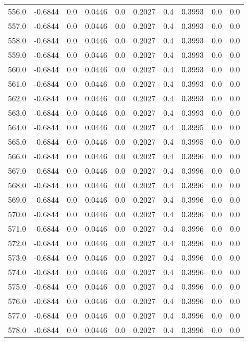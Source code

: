 \begin{longtable}{lrrrrrrrrr}
556.0 & -0.6844 & 0.0 & 0.0446 & 0.0 & 0.2027 & 0.4 & 0.3993 & 0.0 & 0.0 \\
557.0 & -0.6844 & 0.0 & 0.0446 & 0.0 & 0.2027 & 0.4 & 0.3993 & 0.0 & 0.0 \\
558.0 & -0.6844 & 0.0 & 0.0446 & 0.0 & 0.2027 & 0.4 & 0.3993 & 0.0 & 0.0 \\
559.0 & -0.6844 & 0.0 & 0.0446 & 0.0 & 0.2027 & 0.4 & 0.3993 & 0.0 & 0.0 \\
560.0 & -0.6844 & 0.0 & 0.0446 & 0.0 & 0.2027 & 0.4 & 0.3993 & 0.0 & 0.0 \\
561.0 & -0.6844 & 0.0 & 0.0446 & 0.0 & 0.2027 & 0.4 & 0.3993 & 0.0 & 0.0 \\
562.0 & -0.6844 & 0.0 & 0.0446 & 0.0 & 0.2027 & 0.4 & 0.3993 & 0.0 & 0.0 \\
563.0 & -0.6844 & 0.0 & 0.0446 & 0.0 & 0.2027 & 0.4 & 0.3993 & 0.0 & 0.0 \\
564.0 & -0.6844 & 0.0 & 0.0446 & 0.0 & 0.2027 & 0.4 & 0.3995 & 0.0 & 0.0 \\
565.0 & -0.6844 & 0.0 & 0.0446 & 0.0 & 0.2027 & 0.4 & 0.3995 & 0.0 & 0.0 \\
566.0 & -0.6844 & 0.0 & 0.0446 & 0.0 & 0.2027 & 0.4 & 0.3996 & 0.0 & 0.0 \\
567.0 & -0.6844 & 0.0 & 0.0446 & 0.0 & 0.2027 & 0.4 & 0.3996 & 0.0 & 0.0 \\
568.0 & -0.6844 & 0.0 & 0.0446 & 0.0 & 0.2027 & 0.4 & 0.3996 & 0.0 & 0.0 \\
569.0 & -0.6844 & 0.0 & 0.0446 & 0.0 & 0.2027 & 0.4 & 0.3996 & 0.0 & 0.0 \\
570.0 & -0.6844 & 0.0 & 0.0446 & 0.0 & 0.2027 & 0.4 & 0.3996 & 0.0 & 0.0 \\
571.0 & -0.6844 & 0.0 & 0.0446 & 0.0 & 0.2027 & 0.4 & 0.3996 & 0.0 & 0.0 \\
572.0 & -0.6844 & 0.0 & 0.0446 & 0.0 & 0.2027 & 0.4 & 0.3996 & 0.0 & 0.0 \\
573.0 & -0.6844 & 0.0 & 0.0446 & 0.0 & 0.2027 & 0.4 & 0.3996 & 0.0 & 0.0 \\
574.0 & -0.6844 & 0.0 & 0.0446 & 0.0 & 0.2027 & 0.4 & 0.3996 & 0.0 & 0.0 \\
575.0 & -0.6844 & 0.0 & 0.0446 & 0.0 & 0.2027 & 0.4 & 0.3996 & 0.0 & 0.0 \\
576.0 & -0.6844 & 0.0 & 0.0446 & 0.0 & 0.2027 & 0.4 & 0.3996 & 0.0 & 0.0 \\
577.0 & -0.6844 & 0.0 & 0.0446 & 0.0 & 0.2027 & 0.4 & 0.3996 & 0.0 & 0.0 \\
578.0 & -0.6844 & 0.0 & 0.0446 & 0.0 & 0.2027 & 0.4 & 0.3996 & 0.0 & 0.0 \\

\end{longtable}
